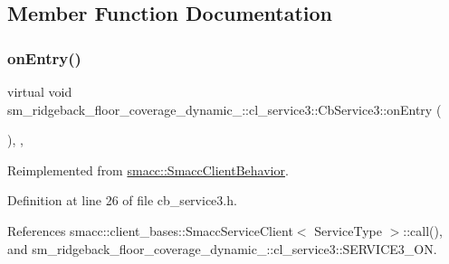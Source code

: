 \subsection{Member Function Documentation}
\mbox{\label{classsm__ridgeback__floor__coverage__dynamic__1_1_1cl__service3_1_1CbService3_a2bea1cd5cff40e33307b0858ea9baf0b}} 
\subsubsection{\texorpdfstring{on\+Entry()}{onEntry()}}
{\footnotesize\ttfamily virtual void sm\+\_\+ridgeback\+\_\+floor\+\_\+coverage\+\_\+dynamic\+\_\+::cl\+\_\+service3\+::\+Cb\+Service3\+::on\+Entry (\begin{DoxyParamCaption}{ }\end{DoxyParamCaption})\hspace{0.3cm}{\ttfamily [inline]}, {\ttfamily [override]}, {\ttfamily [virtual]}}



Reimplemented from \hyperlink{classsmacc_1_1SmaccClientBehavior_ad5d3e1f1697c3cfe66c94cadba948493}{smacc\+::\+Smacc\+Client\+Behavior}.



Definition at line 26 of file cb\+\_\+service3.\+h.



References smacc\+::client\+\_\+bases\+::\+Smacc\+Service\+Client$<$ Service\+Type $>$\+::call(), and sm\+\_\+ridgeback\+\_\+floor\+\_\+coverage\+\_\+dynamic\+\_\+::cl\+\_\+service3\+::\+S\+E\+R\+V\+I\+C\+E3\+\_\+\+ON.


